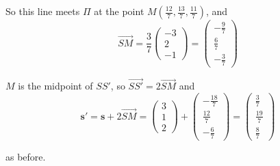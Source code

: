 \documentclass[leqno]{article}
\begin{document}
\begin{enumerate}[
  label=\textbf{\arabic*.},
  leftmargin=*,
  topsep=0pt,
  partopsep=0pt,
  parsep=0pt
]
\begin{djsSolution}
\begin{enumerate}[label=\textbf{(\alph*)}]
{So this line meets \(\Pi\) at the point \(M\left(\frac{12}{7},\frac{13}{7},\frac{11}{7}\right)\), and
\[
\overrightarrow{SM}=\frac37\begin{pmatrix}-3\\2\\-1\end{pmatrix}=\begin{pmatrix}-\frac97\\[2pt]\frac67\\[2pt]-\frac37\end{pmatrix}
\]

\(M\) is the midpoint of \(SS'\), so \(\overrightarrow{SS'}=2\overrightarrow{SM}\) and
\[
\mathbf s'=\mathbf s+2\overrightarrow{SM}=\begin{pmatrix}3\\1\\2\end{pmatrix}+\begin{pmatrix}-\frac{18}{7}\\[2pt]\frac{12}{7}\\[2pt]-\frac67\end{pmatrix}=\begin{pmatrix}\frac37\\[2pt]\frac{19}{7}\\[2pt]\frac87\end{pmatrix}
\]

as before.
\par}
\end{enumerate}
\end{djsSolution}


\newpage

\questionitem


\end{enumerate}
\end{document}
